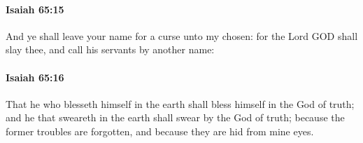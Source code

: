 		\paragraph{Isaiah 65:15} %
			\label{ISAIAH-65-15}

			And ye shall leave your name for a curse unto my chosen: for the Lord GOD shall slay thee, and call his servants by another name:


		\paragraph{Isaiah 65:16} %
			\label{ISAIAH-65-16}

			That he who blesseth himself in the earth shall bless himself in the God of truth; and he that sweareth in the earth shall swear by the God of truth; because the former troubles are forgotten, and because they are hid from mine eyes.


